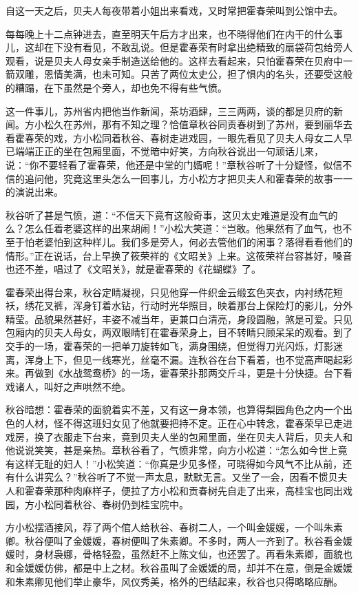 \documentclass[12pt,UTF8]{ctexbook}
\begin{document}
{{{自这一天之后，贝夫人每夜带着小姐出来看戏，又时常把霍春荣叫到公馆中去。

每每晚上十二点钟进去，直至明天午后方才出来，也不晓得他们在内干的什么事儿，这却在下没有看见，不敢乱说。但是霍春荣有时拿出绝精致的扇袋荷包给旁人观看，说是贝夫人母女亲手制造送给他的。这样去看起来，只怕霍春荣在贝府中一箭双雕，恩情美满，也未可知。只苦了两位太史公，担了惧内的名头，还要受这般的糟蹋，在下虽然是个旁人，却也免不得有些气愤。

这一件事儿，苏州省内把他当作新闻，茶坊酒肆，三三两两，谈的都是贝府的新闻。方小松久在苏州，那有不知之理？恰值章秋谷同贡春树到了苏州，要到丽华去看霍春荣的戏，方小松同着秋谷、春树走进戏园，一眼先看见了贝夫人母女二人早已端端正正的坐在包厢里面，不觉暗中好笑，方向秋谷说出一句顽话儿来，说：“你不要轻看了霍春荣，他还是中堂的门婿呢！”章秋谷听了十分疑怪，似信不信的追问他，究竟这里头怎么一回事儿，方小松方才把贝夫人和霍春荣的故事一一的演说出来。

秋谷听了甚是气愤，道：“不信天下竟有这般奇事，这贝太史难道是没有血气的么？怎么任着老婆这样的出来胡闹！”小松大笑道：“岂敢。他果然有了血气，也不至于怕老婆怕到这种样儿。我们多是旁人，何必去管他们的闲事？落得看看他们的情形。”正在说话，台上早换了筱荣祥的《文昭关》上来。这筱荣祥台容甚好，嗓音也还不差，唱过了《文昭关》，就是霍春荣的《花蝴蝶》了。

霍春荣出得台来，秋谷定睛凝视，只见他穿一件织金云缎玄色夹衣，内衬绣花短袄，绣花叉裤，浑身钉着水钻，行动时光华照目，映着那台上保险灯的影儿，分外精莹。品貌果然甚好，丰姿不减当年，更兼口白清亮，身段圆融，煞是可爱。只见包厢内的贝夫人母女，两双眼睛钉在霍春荣身上，目不转睛只顾呆呆的观看。到了交手的一场，霍春荣的一把单刀旋转如飞，满身围绕，但觉得刀光闪烁，灯影迷离，浑身上下，但见一线寒光，丝毫不漏。连秋谷在台下看着，也不觉高声喝起彩来。再做到《水战鸳鸯桥》的一场，霍春荣扑那两交斤斗，更是十分快捷。台下看戏诸人，叫好之声哄然不绝。

秋谷暗想：霍春荣的面貌着实不差，又有这一身本领，也算得梨园角色之内一个出色的人材，怪不得这班妇女见了他就要把持不定。正在心中转念，霍春荣早已走进戏房，换了衣服走下台来，竟到贝夫人坐的包厢里面，坐在贝夫人背后，贝夫人和他说说笑笑，甚是亲热。章秋谷看了，气愤非常，向方小松道：“怎么如今世上竟有这样无耻的妇人！”小松笑道：“你真是少见多怪，可晓得如今风气不比从前，还有什么讲究么？”秋谷听了不觉一声太息，默默无言。又坐了一会，因看不惯贝夫人和霍春荣那种肉麻样子，便拉了方小松和贡春树先自走了出来，高桂宝也同出戏园，方小松同着秋谷、春树仍到桂宝院中。

方小松摆酒接风，荐了两个倌人给秋谷、春树二人，一个叫金媛媛，一个叫朱素卿。秋谷便叫了金媛媛，春树便叫了朱素卿。不多时，两人一齐到了。秋谷看金媛媛时，身材袅娜，骨格轻盈，虽然赶不上陈文仙，也还罢了。再看朱素卿，面貌也和金媛媛仿佛，都是中上之材。秋谷虽叫了金媛媛的局，却并不在意，倒是金媛媛和朱素卿见他们举止豪华，风仪秀美，格外的巴结起来，秋谷也只得略略应酬。

}}}
\end{document}
